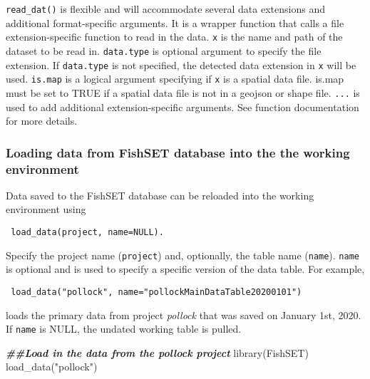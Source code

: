 \documentclass[
]{article}
\newenvironment{Shaded}{\begin{snugshade}}{\end{snugshade}}
\newcommand{\DocumentationTok}[1]{\textcolor[rgb]{0.56,0.35,0.01}{\textbf{\textit{#1}}}}
\newcommand{\FunctionTok}[1]{\textcolor[rgb]{0.00,0.00,0.00}{#1}}
\newcommand{\NormalTok}[1]{#1}
\newcommand{\StringTok}[1]{\textcolor[rgb]{0.31,0.60,0.02}{#1}}
\begin{document}
\texttt{read\_dat()} is flexible and will accommodate several data extensions and additional format-specific arguments. It is a wrapper function that calls a file extension-specific function to read in the data. \texttt{x} is the name and path of the dataset to be read in. \texttt{data.type} is optional argument to specify the file extension. If \texttt{data.type} is not specified, the detected data extension in \texttt{x} will be used. \texttt{is.map} is a logical argument specifying if \texttt{x} is a spatial data file. is.map must be set to TRUE if a spatial data file is not in a geojson or shape file. \texttt{...} is used to add additional extension-specific arguments. See function documentation for more details.

\hypertarget{loading-data-from-fishset-database-into-the-the-working-environment}{%
\subsubsection{Loading data from FishSET database into the the working environment}\label{loading-data-from-fishset-database-into-the-the-working-environment}}

Data saved to the FishSET database can be reloaded into the working environment using

\begin{verbatim}
 load_data(project, name=NULL). 
\end{verbatim}

Specify the project name (\texttt{project}) and, optionally, the table name (\texttt{name}). \texttt{name} is optional and is used to specify a specific version of the data table. For example,

\begin{verbatim}
 load_data("pollock", name="pollockMainDataTable20200101")   
\end{verbatim}

loads the primary data from project \emph{pollock} that was saved on January 1st, 2020. If \texttt{name} is NULL, the undated working table is pulled.

\begin{Shaded}
\begin{Highlighting}[]
\DocumentationTok{\#\#Load in the data from the pollock project}
\FunctionTok{library}\NormalTok{(FishSET)}
\FunctionTok{load\_data}\NormalTok{(}\StringTok{"pollock"}\NormalTok{)}
\end{Highlighting}
\end{Shaded}
\end{document}
